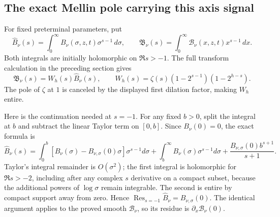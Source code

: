 \subsection*{The exact Mellin pole carrying this axis signal}

For fixed preterminal parameters, put
\[
 \widehat B_\nu(s)=\int_0^\infty
                  B_\nu(\sigma,z,t)\sigma^{s-1}\,d\sigma,\qquad
 \mathfrak B_\nu(s)=\int_0^\infty
                  \mathcal B_\nu(x,z,t)x^{s-1}\,dx .
\]
Both integrals are initially holomorphic on \(\Re s>-1\).
The full transform calculation in the preceding section gives
\[
 \mathfrak B_\nu(s)=W_h(s)\widehat B_\nu(s),\qquad
 W_h(s)=\zeta(s)(1-2^{s-1})(1-2^{h-s}).
\]
The pole of \(\zeta\) at \(1\) is canceled by the displayed first
dilation factor, making \(W_h\) entire.

Here is the continuation needed at \(s=-1\). For any fixed \(b>0\),
split the integral at \(b\) and subtract the linear Taylor term on
\([0,b]\). Since \(B_\nu(0)=0\), the exact formula is
\[
 \widehat B_\nu(s)=
 \int_0^b [B_\nu(\sigma)-B_{\nu,\sigma}(0)\sigma]\sigma^{s-1}d\sigma
 +\int_b^\infty B_\nu(\sigma)\sigma^{s-1}d\sigma
 +\frac{B_{\nu,\sigma}(0)b^{s+1}}{s+1}.
\]
Taylor's integral remainder is \(O(\sigma^2)\); the first integral
is holomorphic for \(\Re s>-2\), including after any complex
\(s\) derivative on a compact subset, because the additional powers
of \(\log\sigma\) remain integrable. The second is entire by compact
support away from zero. Hence
\(\operatorname{Res}_{s=-1}\widehat B_\nu=B_{\nu,\sigma}(0)\).
The identical argument applies to the proved smooth
\(\mathcal B_\nu\), so its residue is \(\partial_x\mathcal B_\nu(0)\).


